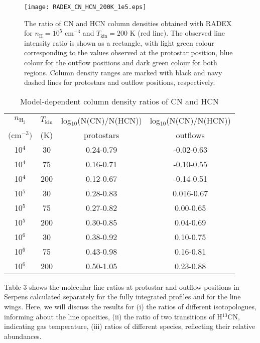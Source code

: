 \documentclass{aa}
\begin{document}
\begin{figure} 
\centering 
\texttt{[image: RADEX\_CN\_HCN\_200K\_1e5.eps]}
\caption{The ratio of CN and HCN column densities obtained with RADEX for $n_\mathrm{H} = 10^5$ cm$^{-3}$ and
$T_\mathrm{kin} = 200$ K (red line). The observed line intensity ratio is
shown as a rectangle, with light green colour corresponding to the values observed at the 
protostar position, blue colour for the outflow positions and dark green colour for both regions. Column density ranges are marked with black and navy dashed lines for protostars and outflow positions, respectively.} 
\label{model} 
\end{figure}
\begin{table} \caption{Model-dependent column density ratios of CN and HCN} 
\centering 
\label{RADEX_Ns} 
\begin{tabular}{c c c c} 
\hline\hline $n_\mathrm{H_2}$ & $T_\mathrm{kin}$ &
log$_{10}$(N(CN)/N(HCN)) &
log$_{10}$(N(CN)/N(HCN)) \\ 
$($cm$^{-3})$ & (K) & protostars & outflows \\ 
\hline 10$^{4}$ & 30 & 0.24-0.79 & -0.02-0.63 \\
10$^{4}$ & 75 & 0.16-0.71 & -0.10-0.55 \\
10$^{4}$ & 200 & 0.12-0.67 & -0.14-0.51 \\ 
10$^{5}$ & 30 & 0.28-0.83 & 0.016-0.67 \\
10$^{5}$ & 75 & 0.27-0.82 & 0.00-0.65 \\
10$^{5}$ & 200 & 0.30-0.85 & 0.04-0.69 \\ 
10$^{6}$ & 30 & 0.38-0.92 & 0.10-0.75 \\ 
10$^{6}$ & 75 & 0.43-0.98 & 0.16-0.81 \\ 
10$^{6}$ & 200 & 0.50-1.05 & 0.23-0.88\\
\hline 
\end{tabular} 
\end{table}
Table 3 shows the molecular line ratios at protostar and outflow positions in Serpens 
calculated separately for the fully integrated profiles and for the line wings. 
Here, we will discuss the results for (i) the ratios of different isotopologues, informing 
about the line opacities, (ii) the ratio of two transitions of H$^{13}$CN,
indicating gas temperature, (iii) ratios of different species, reflecting 
their relative abundances.
\end{document}
